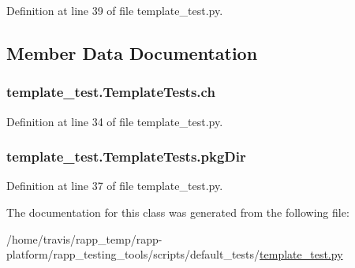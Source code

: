Definition at line 39 of file template\-\_\-test.\-py.



\subsection{Member Data Documentation}
\hypertarget{classtemplate__test_1_1TemplateTests_a8833dd2321b5815213015828ef94ac22}{
\subsubsection[{ch}]{\setlength{\rightskip}{0pt plus 5cm}template\-\_\-test.\-Template\-Tests.\-ch}}\label{classtemplate__test_1_1TemplateTests_a8833dd2321b5815213015828ef94ac22}


Definition at line 34 of file template\-\_\-test.\-py.

\hypertarget{classtemplate__test_1_1TemplateTests_adf21c8077448569b90080d37faf6d84e}{
\subsubsection[{pkg\-Dir}]{\setlength{\rightskip}{0pt plus 5cm}template\-\_\-test.\-Template\-Tests.\-pkg\-Dir}}\label{classtemplate__test_1_1TemplateTests_adf21c8077448569b90080d37faf6d84e}


Definition at line 37 of file template\-\_\-test.\-py.



The documentation for this class was generated from the following file\-:\begin{DoxyCompactItemize}
\item 
/home/travis/rapp\-\_\-temp/rapp-\/platform/rapp\-\_\-testing\-\_\-tools/scripts/default\-\_\-tests/\hyperlink{template__test_8py}{template\-\_\-test.\-py}\end{DoxyCompactItemize}
